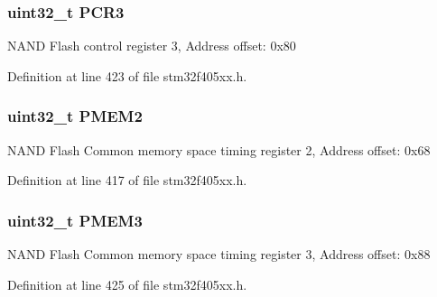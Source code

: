 \subsubsection[{\texorpdfstring{P\+C\+R3}{PCR3}}]{ uint32\+\_\+t P\+C\+R3}\hypertarget{struct_f_s_m_c___bank2__3___type_def_a73861fa74b83973fa1b5f92735c042ef}{}\label{struct_f_s_m_c___bank2__3___type_def_a73861fa74b83973fa1b5f92735c042ef}
N\+A\+ND Flash control register 3, Address offset\+: 0x80 

Definition at line 423 of file stm32f405xx.\+h.

\subsubsection[{\texorpdfstring{P\+M\+E\+M2}{PMEM2}}]{ uint32\+\_\+t P\+M\+E\+M2}\hypertarget{struct_f_s_m_c___bank2__3___type_def_a2e5a7a96de68a6612affa6df8c309c3d}{}\label{struct_f_s_m_c___bank2__3___type_def_a2e5a7a96de68a6612affa6df8c309c3d}
N\+A\+ND Flash Common memory space timing register 2, Address offset\+: 0x68 

Definition at line 417 of file stm32f405xx.\+h.

\subsubsection[{\texorpdfstring{P\+M\+E\+M3}{PMEM3}}]{ uint32\+\_\+t P\+M\+E\+M3}\hypertarget{struct_f_s_m_c___bank2__3___type_def_aba8981e4f06cfb3db7d9959242052f80}{}\label{struct_f_s_m_c___bank2__3___type_def_aba8981e4f06cfb3db7d9959242052f80}
N\+A\+ND Flash Common memory space timing register 3, Address offset\+: 0x88 

Definition at line 425 of file stm32f405xx.\+h.

